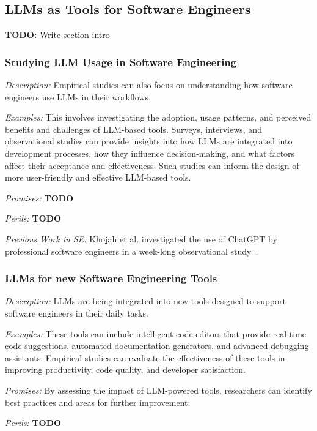 \documentclass[11pt]{article}
\begin{document}
\subsection{LLMs as Tools for Software Engineers}

\textbf{TODO:} Write section intro 

\subsubsection{Studying LLM Usage in Software Engineering}

\emph{Description:} Empirical studies can also focus on understanding how software engineers use LLMs in their workflows. 

\emph{Examples:} This involves investigating the adoption, usage patterns, and perceived benefits and challenges of LLM-based tools. Surveys, interviews, and observational studies can provide insights into how LLMs are integrated into development processes, how they influence decision-making, and what factors affect their acceptance and effectiveness. Such studies can inform the design of more user-friendly and effective LLM-based tools.

\emph{Promises:} \textbf{TODO}

\emph{Perils:} \textbf{TODO}

\emph{Previous Work in SE:} Khojah et al. investigated the use of ChatGPT by professional software engineers in a week-long observational study~\cite{DBLP:journals/pacmse/KhojahM0N24}.

\subsubsection{LLMs for new Software Engineering Tools}

\emph{Description:} LLMs are being integrated into new tools designed to support software engineers in their daily tasks.

\emph{Examples:} These tools can include intelligent code editors that provide real-time code suggestions, automated documentation generators, and advanced debugging assistants. Empirical studies can evaluate the effectiveness of these tools in improving productivity, code quality, and developer satisfaction.

\emph{Promises:} By assessing the impact of LLM-powered tools, researchers can identify best practices and areas for further improvement.

\emph{Perils:} \textbf{TODO}
\end{document}
